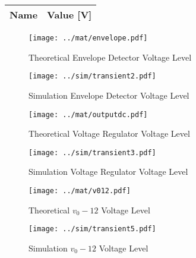 \begin{center}
  \begin{tabular}{ | c | c | }
    \hline    
    {\bf Name} & {\bf Value [V]} \\ \hline
    
  \end{tabular}
\end{center}

\begin{figure}[H]
      \texttt{[image: ../mat/envelope.pdf]}
      \caption{Theoretical Envelope Detector Voltage Level}
    \endminipage\hfill
      \texttt{[image: ../sim/transient2.pdf]}
      \caption{Simulation Envelope Detector Voltage Level}
    \endminipage\hfill
\end{figure}

\begin{figure}[H]
      \texttt{[image: ../mat/outputdc.pdf]}
      \caption{Theoretical Voltage Regulator Voltage Level}
    \endminipage\hfill
      \texttt{[image: ../sim/transient3.pdf]}
      \caption{Simulation Voltage Regulator Voltage Level}
    \endminipage\hfill
\end{figure}

\begin{figure}[H]
      \texttt{[image: ../mat/v012.pdf]}
      \caption{Theoretical $v_0-12$ Voltage Level}
    \endminipage\hfill
      \texttt{[image: ../sim/transient5.pdf]}
      \caption{Simulation $v_0-12$ Voltage Level}
    \endminipage\hfill
\end{figure}

